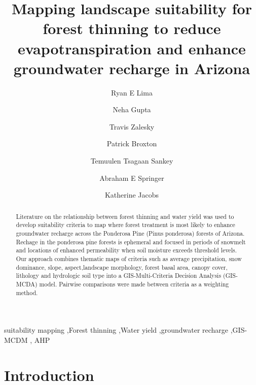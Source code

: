 \documentclass[
  number,
  preprint,
  3p,
  onecolumn]{elsarticle}
\begin{document}
\begin{frontmatter}
\title{Mapping landscape suitability for forest thinning to reduce
evapotranspiration and enhance groundwater recharge in Arizona}
\author[1]{Ryan E Lima%
%
}
\author[2]{Neha Gupta%
%
}

\author[2]{Travis Zalesky%
%
}

\author[2]{Patrick Broxton%
%
}

\author[1]{Temuulen Tsagaan Sankey%
%
}

\author[1]{Abraham E Springer%
%
}

\author[2]{Katherine Jacobs%
%
}










        
\begin{abstract}
Literature on the relationship between forest thinning and water yield
was used to develop suitability criteria to map where forest treatment
is most likely to enhance groundwater recharge across the Ponderosa Pine
(Pinus ponderosa) forests of Arizona. Rechage in the ponderosa pine
forests is ephemeral and focused in periods of snowmelt and locations of
enhanced permeability when soil moisture exceeds threshold levels. Our
approach combines thematic maps of criteria such as average
precipitation, snow dominance, slope, aspect,landscape morphology,
forest basal area, canopy cover, lithology and hydrologic soil type into
a GIS-Multi-Criteria Decision Analysis (GIS-MCDA) model. Pairwise
comparisons were made between criteria as a weighting method.
\end{abstract}





\begin{keyword}
    suitability mapping \sep Forest thinning \sep Water
yield \sep groundwater recharge \sep GIS-MCDM \sep 
    AHP
\end{keyword}
\end{frontmatter}
    

\section{Introduction}\label{sec-intro}
\end{document}
